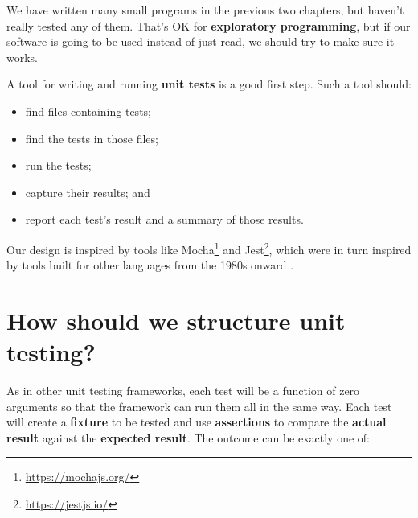 \documentclass[krantzl]{krantz}
\newcommand{\glossref}[1]{\textbf{#1}}
\newcommand{\hreffoot}[2]{{#1}\footnote{\href{#2}{#2}}}
\begin{document}
We have written many small programs in the previous two chapters,
but haven't really tested any of them.
That's OK for \glossref{exploratory programming},
but if our software is going to be used instead of just read,
we should try to make sure it works.


A tool for writing and running \glossref{unit tests} is a good first step.
Such a tool should:

\begin{itemize}

\item find files containing tests;

\item find the tests in those files;

\item run the tests;

\item capture their results; and

\item report each test's result and a summary of those results.

\end{itemize}


Our design is inspired by tools like \hreffoot{Mocha}{https://mochajs.org/} and \hreffoot{Jest}{https://jestjs.io/},
which were in turn inspired by tools built for other languages
from the 1980s onward \cite{Meszaros2007,Tudose2020}.

\section{How should we structure unit testing?}\label{unit-test-structure}


As in other unit testing frameworks,
each test will be a function of zero arguments
so that the framework can run them all in the same way.
Each test will create a \glossref{fixture} to be tested
and use \glossref{assertions}
to compare the \glossref{actual result}
against the \glossref{expected result}.
The outcome can be exactly one of:
\end{document}
